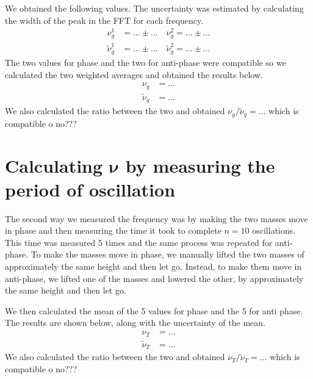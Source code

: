 \documentclass{article}
\begin{document}
We obtained the following values. The uncertainty was estimated by calculating the width of the peak in the FFT for each frequency.
\begin{align}
    \nu_g^1 &= \dots \pm \dots \quad \nu_g^2 = \dots \pm \dots \\
    \tilde \nu_g^1 &= \dots \pm \dots \quad \tilde \nu_g^2 = \dots \pm \dots 
\end{align}
The two values for phase and the two for anti-phase were compatible so we calculated the two weighted averages and obtained the results below.
\begin{align}
    \nu_g &= \dots \\
    \tilde \nu_g &= \dots
\end{align}
We also calculated the ratio between the two and obtained $ \nu_g / \tilde \nu_g = \dots$ which is compatible o no???


\section{Calculating $\bm \nu$ by measuring the period of oscillation}

The second way we measured the frequency was by making the two masses move in phase and then measuring the time it took to complete $n=10$ oscillations. This time was measured 5 times and the same process was repeated for anti-phase. To make the masses move in phase, we manually lifted the two masses of approximately the same height and then let go. Instead, to make them move in anti-phase, we lifted one of the masses and lowered the other, by approximately the same height and then let go.

We then calculated the mean of the 5 values for phase and the 5 for anti phase. The results are shown below, along with the uncertainty of the mean. 
\begin{align}
    \nu_T &= \dots \\
    \tilde \nu_T &= \dots
\end{align}
We also calculated the ratio between the two and obtained $ \nu_T / \tilde \nu_T = \dots$ which is compatible o no???
\end{document}
